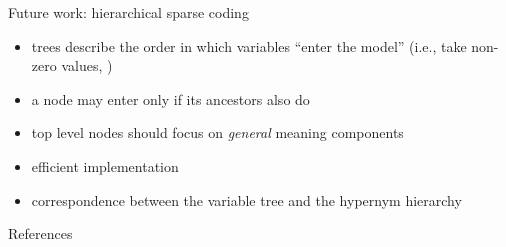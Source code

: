 \documentclass{beamer}
\newlength{\onecolwid}
\begin{document}
\begin{frame}[t]
\begin{columns}[t]
\begin{column}{\onecolwid}
  \begin{block}{Future work: hierarchical sparse coding}
    \begin{itemize}
      \item trees describe the order in which variables “enter the model”
        (i.e., take non-zero values, \cite{Zhao:2009})
      \item a node may enter only if its ancestors also do
      \item %
        top level nodes should focus on \emph{general} meaning components
      \item efficient implementation \citep{Yogatama:2015}
      \item correspondence between
        the variable tree and the hypernym hierarchy
    \end{itemize}
  \end{block}


  \begin{block}{References}
    \footnotesize
    
    
  \end{block}
\end{column} \end{columns} \end{frame}
\end{document}
